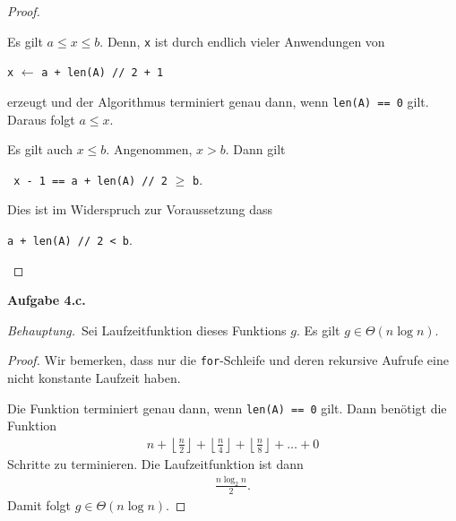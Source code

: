 \documentclass[12pt]{extarticle}
\newcommand{\aufgn}[1]{\textbf{Aufgabe #1.}}
\newcommand{\beh}{\textit{Behauptung.}\ }
\begin{document}
\begin{proof}
\begin{itemize}
  Es gilt \(a \le x \le b\).  Denn, \texttt{x} ist durch
  endlich vieler Anwendungen von
\begin{center}
\texttt{x} \(\leftarrow\) \texttt{a + len(A) // 2 + 1} \\
\end{center}
erzeugt und der Algorithmus terminiert genau dann, wenn
\texttt{len(A) == 0} gilt.  Daraus folgt \(a \le x\).

Es gilt auch \(x \le b\).  Angenommen, \(x > b\).  Dann gilt
\begin{center}
\texttt{ x - 1 == a + len(A) // 2} \(\ge\) \texttt{b}. \\
\end{center}
Dies ist im Widerspruch zur Voraussetzung dass
\begin{center}
\texttt{a + len(A) // 2 < b}. \\
\end{center}
\end{itemize}
\end{proof}
\aufgn{4.c}

\beh Sei Laufzeitfunktion dieses Funktions \(g\).  Es gilt
\(g \in \Theta(n\log n)\).

\begin{proof}

  Wir bemerken, dass nur die \texttt{for}-Schleife und deren rekursive
  Aufrufe eine nicht konstante Laufzeit haben.

  Die Funktion terminiert genau dann, wenn
  \texttt{len(A) == 0} gilt.  Dann benötigt die
  Funktion
\begin{align*}
n + \left \lfloor \frac{n}{2}  \right \rfloor + \left \lfloor
  \frac{n}{4} \right \rfloor + \left \lfloor \frac{n}{8}
  \right \rfloor + \ldots + 0
\end{align*}
Schritte zu terminieren.  Die Laufzeitfunktion ist dann
\begin{align*}
\frac{n\log_2{n}}{2}.
\end{align*}
Damit folgt  \(g \in \Theta(n \log n)\).
\end{proof}
\end{document}
